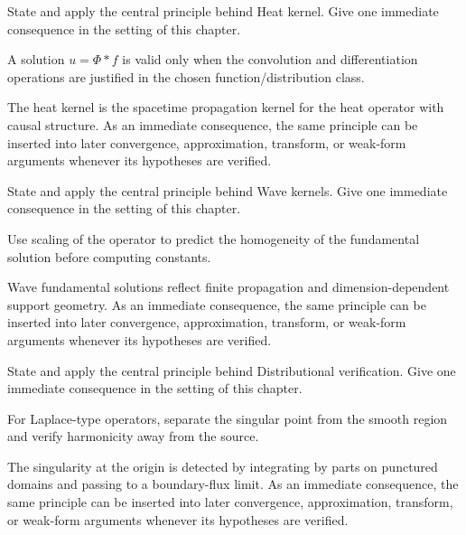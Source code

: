 \begin{exercise}\label{exr:iii24-04}
State and apply the central principle behind Heat kernel. Give one immediate consequence in the setting of this chapter.
\end{exercise}
\begin{hint}
A solution \(u=\Phi*f\) is valid only when the convolution and differentiation operations are justified in the chosen function/distribution class.
\end{hint}
\begin{solution}
The heat kernel is the spacetime propagation kernel for the heat operator with causal structure. As an immediate consequence, the same principle can be inserted into later convergence, approximation, transform, or weak-form arguments whenever its hypotheses are verified.
\end{solution}

\begin{exercise}\label{exr:iii24-05}
State and apply the central principle behind Wave kernels. Give one immediate consequence in the setting of this chapter.
\end{exercise}
\begin{hint}
Use scaling of the operator to predict the homogeneity of the fundamental solution before computing constants.
\end{hint}
\begin{solution}
Wave fundamental solutions reflect finite propagation and dimension-dependent support geometry. As an immediate consequence, the same principle can be inserted into later convergence, approximation, transform, or weak-form arguments whenever its hypotheses are verified.
\end{solution}

\begin{exercise}\label{exr:iii24-06}
State and apply the central principle behind Distributional verification. Give one immediate consequence in the setting of this chapter.
\end{exercise}
\begin{hint}
For Laplace-type operators, separate the singular point from the smooth region and verify harmonicity away from the source.
\end{hint}
\begin{solution}
The singularity at the origin is detected by integrating by parts on punctured domains and passing to a boundary-flux limit. As an immediate consequence, the same principle can be inserted into later convergence, approximation, transform, or weak-form arguments whenever its hypotheses are verified.
\end{solution}

